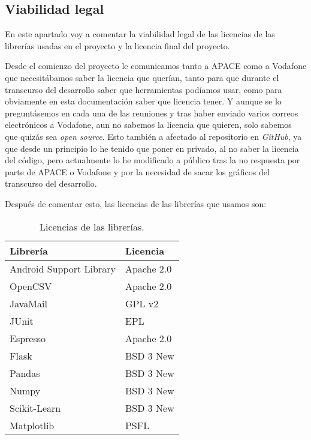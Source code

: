 \subsection{Viabilidad legal}
En este apartado voy a comentar la viabilidad legal de las licencias de las librerías usadas en el proyecto y la licencia final del proyecto.

Desde el comienzo del proyecto le comunicamos tanto a APACE como a Vodafone que necesitábamos saber la licencia que querían, tanto para que durante el transcurso del desarrollo saber que herramientas podíamos usar, como para obviamente en esta documentación saber que licencia tener. Y aunque se lo preguntásemos en cada una de las reuniones y tras haber enviado varios correos electrónicos a Vodafone, aun no sabemos la licencia que quieren, solo sabemos que quizás sea \textit{open source}. Esto también a afectado al repositorio en \textit{GitHub}, ya que desde un principio lo he tenido que poner en privado, al no saber la licencia del código, pero actualmente lo he modificado a público tras la no respuesta por parte de APACE o Vodafone y por la necesidad de sacar los gráficos del transcurso del desarrollo.

Después de comentar esto, las licencias de las librerías que usamos son:

\begin{table}[H]
	\centering
	\begin{tabular}{ll}
		\toprule
		\textbf{Librería}       & \textbf{Licencia} \\ \hline
		Android Support Library & Apache 2.0        \\
		OpenCSV                 & Apache 2.0        \\
		JavaMail                & GPL v2            \\
		JUnit                   & EPL               \\
		Espresso                & Apache 2.0        \\
		Flask                   & BSD 3 New              \\
		Pandas                  & BSD 3 New            \\
		Numpy                   & BSD 3 New           \\
		Scikit-Learn            & BSD 3 New   \\
		Matplotlib              & PSFL              \\ \bottomrule
	\end{tabular}
	\caption{Licencias de las librerías.}
\end{table}

